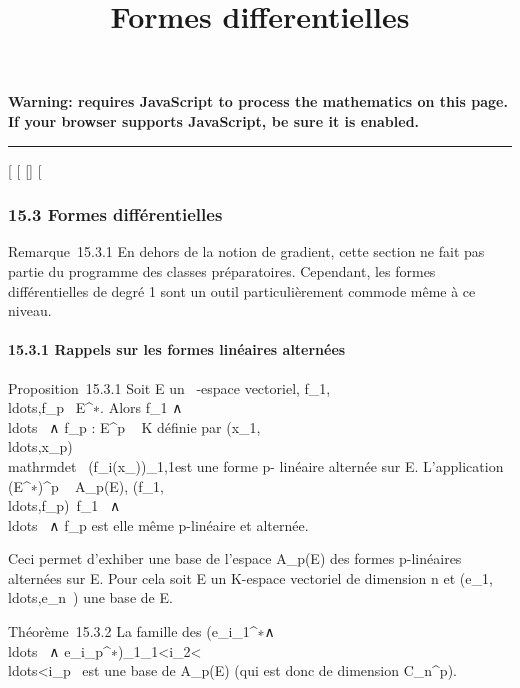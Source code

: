 \documentclass[]{article}
\title{Formes differentielles}
\author{}
\date{}
\begin{document}
\maketitle

\textbf{Warning: 
requires JavaScript to process the mathematics on this page.\\ If your
browser supports JavaScript, be sure it is enabled.}

\begin{center}\rule{3in}{0.4pt}\end{center}

{[}
{[}
{[}{]}
{[}

\subsubsection{15.3 Formes différentielles}

Remarque~15.3.1 En dehors de la notion de gradient, cette section ne
fait pas partie du programme des classes préparatoires. Cependant, les
formes différentielles de degré 1 sont un outil particulièrement commode
même à ce niveau.

\paragraph{15.3.1 Rappels sur les formes linéaires alternées}

Proposition~15.3.1 Soit E un ~-espace vectoriel,
f\_1,\\ldots,f\_p~
\in E^∗. Alors f\_1
∧\\ldots~ ∧
f\_p : E^p \rightarrow~ K définie par
(x\_1,\\ldots,x\_p)\mapsto~\\mathrm{det}~
(f\_i(x\_\jmath))\_1\leqi\leqp,1\leq\jmath\leqp est une forme p-
linéaire alternée sur E. L'application (E^∗)^p \rightarrow~
A\_p(E),
(f\_1,\\ldots,f\_p)\mapsto~f\_1~
∧\\ldots~ ∧
f\_p est elle même p-linéaire et alternée.

Ceci permet d'exhiber une base de l'espace A\_p(E) des formes
p-linéaires alternées sur E. Pour cela soit E un K-espace vectoriel de
dimension n et
(e\_1,\\ldots,e\_n~)
une base de E.

Théorème~15.3.2 La famille des
(e\_i\_1^∗∧\\ldots~
∧
e\_i\_p^∗)\_1\leqi\_1\textless{}i\_2\textless{}\\ldots\textless{}i\_p\leqn~
est une base de A\_p(E) (qui est donc de dimension
C\_n^p).
\end{document}
